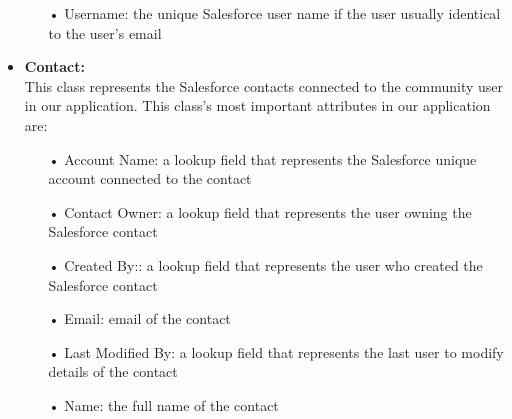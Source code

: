 \begin{itemize}
\begin{itemize}
\item[•] Username: the unique Salesforce user name if the user usually identical to the user's email
\end{itemize}
\item \textbf{Contact:}\\
This class represents the Salesforce contacts connected to the community user in our application. This class's most important attributes in our application are:
\begin{itemize}
\item[•] Account Name: a lookup field that represents the Salesforce unique account connected to the contact
\item[•] Contact Owner: a lookup field that represents the user owning the Salesforce contact
\item[•] Created By:: a lookup field that represents the user who created the Salesforce contact
\item[•] Email: email of the contact
\item[•] Last Modified By: a lookup field that represents the last user to modify details of the contact
\item[•] Name: the full name of the contact


\end{itemize}
\end{itemize}
